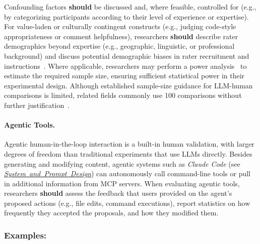 \documentclass[smallextended]{svjour3}
\newcommand{\should}{\textbf{should}\xspace}
\newcommand{\design}{\hyperref[sec:report-system-and-prompt-design]{\mbox{\emph{System and Prompt Design}}}\xspace}
\newcommand{\design}{\href{/guidelines/design/}{\emph{System and Prompt Design}}\xspace}
\newcommand{\guidelinesubsubsection}[1]{\subsubsection{\bfseries #1:}}
\newcommand{\guidelineparagraph}[1]{\paragraph{#1.}}
\newcommand{\guidelinesubsubsection}[1]{\subsubsection{#1}}
\newcommand{\guidelineparagraph}[1]{\paragraph{#1}}
\begin{document}
Confounding factors \should be discussed and, where feasible, controlled for (e.g., by categorizing participants according to their level of experience or expertise).
For value-laden or culturally contingent constructs (e.g., judging code-style appropriateness or comment helpfulness), researchers \should describe rater demographics beyond expertise (e.g., geographic, linguistic, or professional background) and discuss potential demographic biases in rater recruitment and instructions~\cite{bean2025measuring}.
Where applicable, researchers may perform a power analysis~\cite{Cohen1992,DBLP:journals/infsof/DybaKS06} to estimate the required sample size, ensuring sufficient statistical power in their experimental design.
Although established sample-size guidance for LLM-human comparisons is limited, related fields commonly use 100 comparisons without further justification~\cite{DBLP:journals/npjdm/TamSKSPMOWVFMCSPW24}.

\guidelineparagraph{Agentic Tools}
Agentic human-in-the-loop interaction is a built-in human validation, with larger degrees of freedom than traditional experiments that use LLMs directly.
Besides generating and modifying content, agentic systems such as \emph{Claude Code} (see \design) can autonomously call command-line tools or pull in additional information from MCP servers.
When evaluating agentic tools, researchers \should assess the feedback that users provided on the agent's proposed actions (e.g., file edits, command executions), report statistics on how frequently they accepted the proposals, and how they modified them.

\guidelinesubsubsection{Examples}
\end{document}
